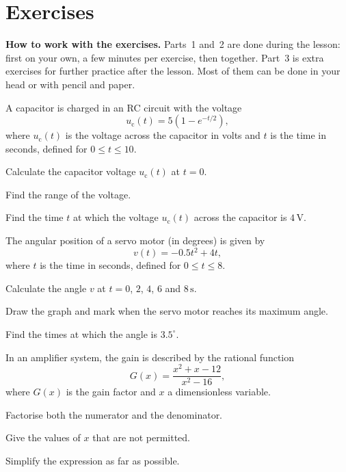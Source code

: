 
\section{Exercises}
\label{c9:sec:uppgifter}

\begin{aside}
\textbf{How to work with the exercises.} Parts~1 and~2 are done during the lesson: first on your
own, a few minutes per exercise, then together. Part~3 is extra exercises for further practice
after the lesson. Most of them can be done in your head or with pencil and paper.

\end{aside}


A capacitor is charged in an RC circuit with the voltage
\[
  u_{\text{c}}(t) = 5\left(1 - e^{-t/2}\right),
\]
where $u_{\text{c}}(t)$ is the voltage across the capacitor in volts and $t$ is the time in
seconds, defined for $0 \leq t \leq 10$.
\begin{parts}
  \item Calculate the capacitor voltage $u_{\text{c}}(t)$ at $t = 0$.
  \item Find the range of the voltage.
  \item Find the time $t$ at which the voltage $u_{\text{c}}(t)$ across the capacitor is
    $4\,\text{V}$.
\end{parts}

The angular position of a servo motor (in degrees) is given by
\[
  v(t) = -0.5t^2 + 4t,
\]
where $t$ is the time in seconds, defined for $0 \leq t \leq 8$.
\begin{parts}
  \item Calculate the angle $v$ at $t = 0$, $2$, $4$, $6$ and $8\,\text{s}$.
  \item Draw the graph and mark when the servo motor reaches its maximum angle.
  \item Find the times at which the angle is $3.5^{\circ}$.
\end{parts}

In an amplifier system, the gain is described by the rational function
\[
  G(x) = \frac{x^2 + x - 12}{x^2 - 16},
\]
where $G(x)$ is the gain factor and $x$ a dimensionless variable.
\begin{parts}
  \item Factorise both the numerator and the denominator.
  \item Give the values of $x$ that are not permitted.
  \item Simplify the expression as far as possible.
\end{parts}

